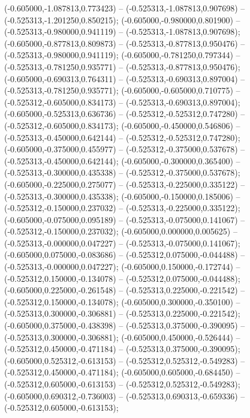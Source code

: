  (-0.605000,-1.087813,0.773423) -- (-0.525313,-1.087813,0.907698) -- (-0.525313,-1.201250,0.850215);
 (-0.605000,-0.980000,0.801900) -- (-0.525313,-0.980000,0.941119) -- (-0.525313,-1.087813,0.907698);
 (-0.605000,-0.877813,0.809873) -- (-0.525313,-0.877813,0.950476) -- (-0.525313,-0.980000,0.941119);
 (-0.605000,-0.781250,0.797344) -- (-0.525313,-0.781250,0.935771) -- (-0.525313,-0.877813,0.950476);
 (-0.605000,-0.690313,0.764311) -- (-0.525313,-0.690313,0.897004) -- (-0.525313,-0.781250,0.935771);
 (-0.605000,-0.605000,0.710775) -- (-0.525312,-0.605000,0.834173) -- (-0.525313,-0.690313,0.897004);
 (-0.605000,-0.525313,0.636736) -- (-0.525312,-0.525312,0.747280) -- (-0.525312,-0.605000,0.834173);
 (-0.605000,-0.450000,0.546806) -- (-0.525313,-0.450000,0.642144) -- (-0.525312,-0.525312,0.747280);
 (-0.605000,-0.375000,0.455977) -- (-0.525312,-0.375000,0.537678) -- (-0.525313,-0.450000,0.642144);
 (-0.605000,-0.300000,0.365400) -- (-0.525313,-0.300000,0.435338) -- (-0.525312,-0.375000,0.537678);
 (-0.605000,-0.225000,0.275077) -- (-0.525313,-0.225000,0.335122) -- (-0.525313,-0.300000,0.435338);
 (-0.605000,-0.150000,0.185006) -- (-0.525312,-0.150000,0.237032) -- (-0.525313,-0.225000,0.335122);
 (-0.605000,-0.075000,0.095189) -- (-0.525313,-0.075000,0.141067) -- (-0.525312,-0.150000,0.237032);
 (-0.605000,0.000000,0.005625) -- (-0.525313,-0.000000,0.047227) -- (-0.525313,-0.075000,0.141067);
 (-0.605000,0.075000,-0.083686) -- (-0.525312,0.075000,-0.044488) -- (-0.525313,-0.000000,0.047227);
 (-0.605000,0.150000,-0.172744) -- (-0.525312,0.150000,-0.134078) -- (-0.525312,0.075000,-0.044488);
 (-0.605000,0.225000,-0.261548) -- (-0.525313,0.225000,-0.221542) -- (-0.525312,0.150000,-0.134078);
 (-0.605000,0.300000,-0.350100) -- (-0.525313,0.300000,-0.306881) -- (-0.525313,0.225000,-0.221542);
 (-0.605000,0.375000,-0.438398) -- (-0.525313,0.375000,-0.390095) -- (-0.525313,0.300000,-0.306881);
 (-0.605000,0.450000,-0.526444) -- (-0.525312,0.450000,-0.471184) -- (-0.525313,0.375000,-0.390095);
 (-0.605000,0.525312,-0.613153) -- (-0.525312,0.525312,-0.549283) -- (-0.525312,0.450000,-0.471184);
 (-0.605000,0.605000,-0.684450) -- (-0.525312,0.605000,-0.613153) -- (-0.525312,0.525312,-0.549283);
 (-0.605000,0.690312,-0.736003) -- (-0.525313,0.690313,-0.659336) -- (-0.525312,0.605000,-0.613153);
